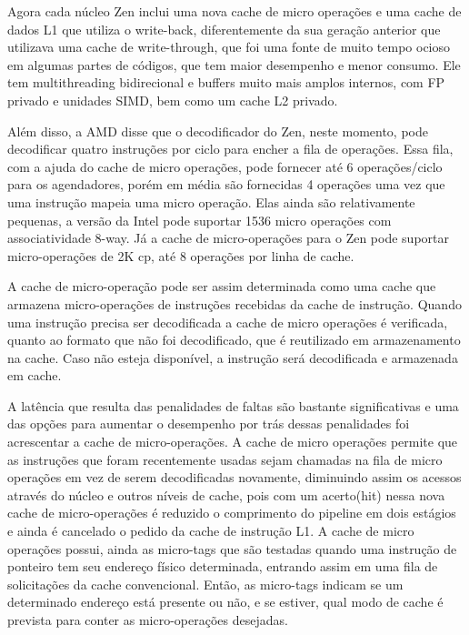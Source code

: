 \documentclass[12pt]{article}
\begin{document}
Agora cada núcleo Zen inclui uma nova cache de micro operações e uma cache de dados L1 que utiliza o write-back, diferentemente da sua geração anterior que utilizava uma cache de write-through, que foi uma fonte de muito tempo ocioso em algumas partes de códigos, que tem maior desempenho e menor consumo. Ele tem multithreading bidirecional e buffers muito mais amplos internos, com FP privado e unidades SIMD, bem como um cache L2 privado.

Além disso, a AMD disse que o decodificador do Zen, neste momento, pode decodificar quatro instruções por ciclo para encher a fila de operações. Essa fila, com a ajuda do cache de micro operações, pode fornecer até 6 operações/ciclo para os agendadores, porém em média são fornecidas 4 operações uma vez que uma instrução mapeia uma micro operação. Elas ainda são relativamente pequenas, a versão da Intel pode suportar 1536 micro operações com associatividade 8-way. Já a cache de micro-operações para o Zen pode suportar micro-operações de 2K cp, até 8 operações por linha de cache.

A cache de micro-operação pode ser assim determinada como uma cache que armazena micro-operações de instruções recebidas da cache de instrução. Quando uma instrução precisa ser decodificada a cache de micro operações é verificada, quanto ao formato que não foi decodificado, que é reutilizado em armazenamento na cache. Caso não esteja disponível, a instrução será decodificada e armazenada em cache.

A latência que resulta das penalidades de faltas são bastante significativas e uma das opções para aumentar o desempenho por trás dessas penalidades foi acrescentar a cache de micro-operações. A cache de micro operações permite que as instruções que foram recentemente usadas sejam chamadas na fila de micro operações em vez de serem decodificadas novamente, diminuindo assim os acessos através do núcleo e outros níveis de cache, pois com um acerto(hit) nessa nova cache de micro-operações é reduzido o comprimento do pipeline em dois estágios e ainda é cancelado o pedido da cache de instrução L1. A cache de micro operações possui, ainda as micro-tags que são testadas quando uma instrução de ponteiro tem seu endereço físico determinada, entrando assim em uma fila de solicitações da cache convencional. Então, as micro-tags indicam se um determinado endereço está presente ou não, e se estiver, qual modo de cache é prevista para conter as micro-operações desejadas.
\end{document}
